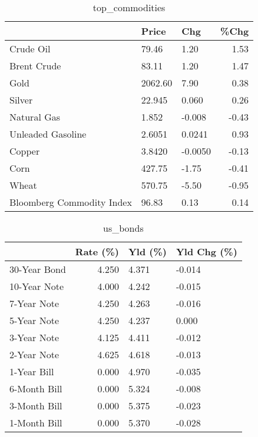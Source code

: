 \documentclass{article}%
\begin{document}
\begin{table}[htbp]%
\caption{top\_commodities}%
\centering%
\begin{adjustbox}{width=1\textwidth}%
\begin{tabular}{lllr}
\toprule
                          &   Price &     Chg &  \%Chg \\
\midrule
               Crude Oil  &   79.46 &    1.20 &  1.53 \\
             Brent Crude  &   83.11 &    1.20 &  1.47 \\
                    Gold  & 2062.60 &    7.90 &  0.38 \\
                  Silver  &  22.945 &   0.060 &  0.26 \\
             Natural Gas  &   1.852 &  -0.008 & -0.43 \\
       Unleaded Gasoline  &  2.6051 &  0.0241 &  0.93 \\
                  Copper  &  3.8420 & -0.0050 & -0.13 \\
                    Corn  &  427.75 &   -1.75 & -0.41 \\
                   Wheat  &  570.75 &   -5.50 & -0.95 \\
Bloomberg Commodity Index &   96.83 &    0.13 &  0.14 \\
\bottomrule
\end{tabular}
%
\end{adjustbox}%
\end{table}

%


\begin{table}[htbp]%
\caption{us\_bonds}%
\centering%
\begin{adjustbox}{width=1\textwidth}%
\begin{tabular}{lrll}
\toprule
             &  Rate (\%) & Yld (\%) & Yld Chg (\%) \\
\midrule
30-Year Bond &     4.250 &   4.371 &      -0.014 \\
10-Year Note &     4.000 &   4.242 &      -0.015 \\
 7-Year Note &     4.250 &   4.263 &      -0.016 \\
 5-Year Note &     4.250 &   4.237 &       0.000 \\
 3-Year Note &     4.125 &   4.411 &      -0.012 \\
 2-Year Note &     4.625 &   4.618 &      -0.013 \\
 1-Year Bill &     0.000 &   4.970 &      -0.035 \\
6-Month Bill &     0.000 &   5.324 &      -0.008 \\
3-Month Bill &     0.000 &   5.375 &      -0.023 \\
1-Month Bill &     0.000 &   5.370 &      -0.028 \\
\bottomrule
\end{tabular}
%
\end{adjustbox}%
\end{table}
\end{document}
